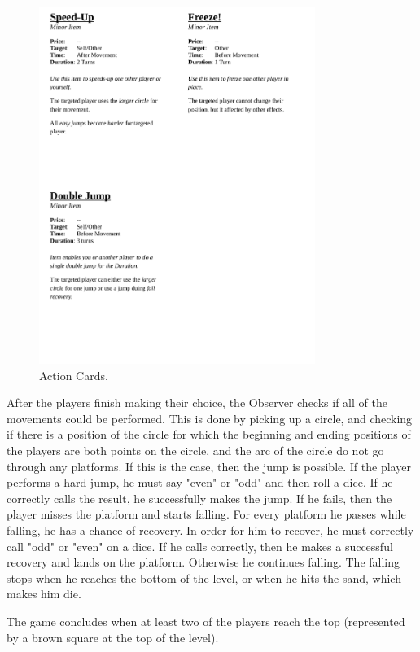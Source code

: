 \begin{figure}
    \centering
    \includegraphics[width=0.8\textwidth]{figures/Prototype/topmeifyoucan_2.png}
    \caption{Action Cards.}
    \label{fig:prot_2}
\end{figure}


After the players finish making their choice, the Observer checks if all of the movements could be performed. This is done by picking up a circle, and checking if there is a position of the circle for which the beginning and ending positions of the players are  both points on the circle, and the arc of the circle do not go through any platforms. If this is the case, then the jump is possible. If the player performs a hard jump, he must say "even" or "odd" and then roll a dice. If he correctly calls the result, he successfully makes the jump. If he fails, then the player misses the platform and starts falling. For every platform he passes while falling, he has a chance of recovery. In order for him to recover, he must correctly call "odd" or "even" on a dice. If he calls correctly, then he makes a successful recovery and lands on the platform. Otherwise he continues falling. The falling stops when he reaches the bottom of the level, or when he hits the sand, which makes him die.

The game concludes when at least two of the players reach the top (represented by a brown square  at the top of the level).


